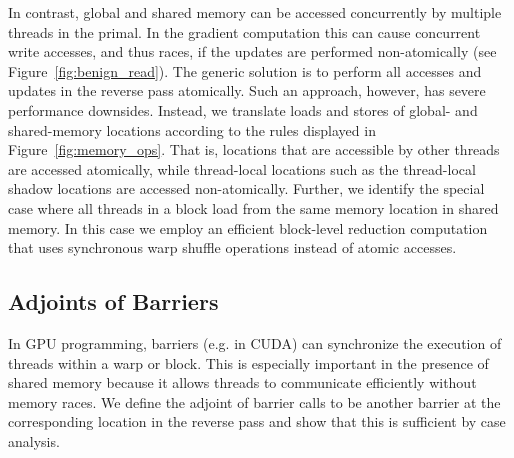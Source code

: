 In contrast, global and shared memory can be accessed concurrently by multiple threads in the primal.
In the gradient computation this can cause concurrent write accesses, and thus races, if the updates are performed non-atomically (see Figure~\ref{fig:benign_read}).
The generic solution is to perform all accesses and updates in the reverse pass atomically. Such an approach, however, has severe performance downsides.
Instead, we translate loads and stores of global- and shared-memory locations according to the rules displayed in Figure~\ref{fig:memory_ops}.
That is, locations that are accessible by other threads are accessed atomically, while thread-local locations such as the thread-local shadow locations are accessed non-atomically.
Further, we identify the special case where all threads in a block load from the same memory location in shared memory.
In this case we employ an efficient block-level reduction computation that uses synchronous warp shuffle operations instead of atomic accesses.

%
 


\subsection{Adjoints of Barriers}
\label{subsec:barrier}

In GPU programming, barriers (e.g.  in CUDA) can synchronize the execution of threads within a warp or block.
This is especially important in the presence of shared memory because it allows threads to communicate efficiently without memory races. 
We define the adjoint of barrier calls to be another barrier at the corresponding location in the reverse pass and show that this is sufficient by case analysis.

